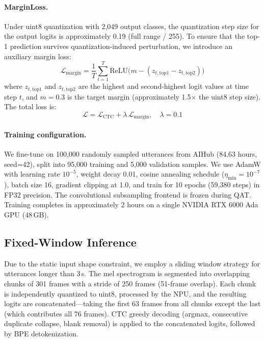 \documentclass[a4paper,11pt,twocolumn]{article}
\begin{document}
\paragraph{MarginLoss.}
Under uint8 quantization with 2,049 output classes, the quantization step size for the output logits is approximately 0.19 (full range / 255). To ensure that the top-1 prediction survives quantization-induced perturbation, we introduce an auxiliary margin loss:
\begin{equation}
\mathcal{L}_{\text{margin}} = \frac{1}{T} \sum_{t=1}^{T} \text{ReLU}\big(m - (z_{t,\text{top1}} - z_{t,\text{top2}})\big)
\end{equation}
where $z_{t,\text{top1}}$ and $z_{t,\text{top2}}$ are the highest and second-highest logit values at time step $t$, and $m = 0.3$ is the target margin (approximately 1.5$\times$ the uint8 step size). The total loss is:
\begin{equation}
\mathcal{L} = \mathcal{L}_{\text{CTC}} + \lambda \, \mathcal{L}_{\text{margin}}, \quad \lambda = 0.1
\end{equation}

\paragraph{Training configuration.}
We fine-tune on 100,000 randomly sampled utterances from AIHub (84.63 hours, seed=42), split into 95,000 training and 5,000 validation samples. We use AdamW with learning rate $10^{-5}$, weight decay 0.01, cosine annealing schedule ($\eta_\text{min}{=}10^{-7}$), batch size 16, gradient clipping at 1.0, and train for 10 epochs (59,380 steps) in FP32 precision. The convolutional subsampling frontend is frozen during QAT. Training completes in approximately 2 hours on a single NVIDIA RTX 6000 Ada GPU (48\,GB).

\subsection{Fixed-Window Inference}

Due to the static input shape constraint, we employ a sliding window strategy for utterances longer than 3\,s. The mel spectrogram is segmented into overlapping chunks of 301 frames with a stride of 250 frames (51-frame overlap). Each chunk is independently quantized to uint8, processed by the NPU, and the resulting logits are concatenated---taking the first 63 frames from all chunks except the last (which contributes all 76 frames). CTC greedy decoding (argmax, consecutive duplicate collapse, blank removal) is applied to the concatenated logits, followed by BPE detokenization.
\end{document}

